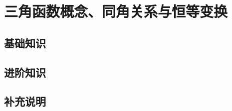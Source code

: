 \section{三角函数概念、同角关系与恒等变换}
  \subsection{基础知识}
    \subsection{}
  \subsection{进阶知识}
  \subsection{补充说明}

